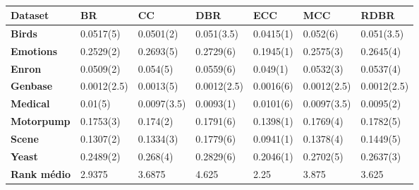 \begin{table}[h]
\begin{tabular}{lllllll}
\hline
\textbf{Dataset}    & \textbf{BR} & \textbf{CC} & \textbf{DBR} & \textbf{ECC} & \textbf{MCC} & \textbf{RDBR} \\ \hline
\textbf{Birds}      & 0.0517(5)   & 0.0501(2)   & 0.051(3.5)   & 0.0415(1)    & 0.052(6)     & 0.051(3.5)    \\
\textbf{Emotions}   & 0.2529(2)   & 0.2693(5)   & 0.2729(6)    & 0.1945(1)    & 0.2575(3)    & 0.2645(4)     \\
\textbf{Enron}      & 0.0509(2)   & 0.054(5)    & 0.0559(6)    & 0.049(1)     & 0.0532(3)    & 0.0537(4)     \\
\textbf{Genbase}    & 0.0012(2.5) & 0.0013(5)   & 0.0012(2.5)  & 0.0016(6)    & 0.0012(2.5)  & 0.0012(2.5)   \\
\textbf{Medical}    & 0.01(5)     & 0.0097(3.5) & 0.0093(1)    & 0.0101(6)    & 0.0097(3.5)  & 0.0095(2)     \\
\textbf{Motorpump}  & 0.1753(3)   & 0.174(2)    & 0.1791(6)    & 0.1398(1)    & 0.1769(4)    & 0.1782(5)     \\
\textbf{Scene}      & 0.1307(2)   & 0.1334(3)   & 0.1779(6)    & 0.0941(1)    & 0.1378(4)    & 0.1449(5)     \\
\textbf{Yeast}      & 0.2489(2)   & 0.268(4)    & 0.2829(6)    & 0.2046(1)    & 0.2702(5)    & 0.2637(3)     \\ \hline
\textbf{Rank médio} & 2.9375      & 3.6875      & 4.625        & 2.25         & 3.875        & 3.625         \\ \hline
\end{tabular}
\caption{}
\label{tab:HLj48}
\end{table}